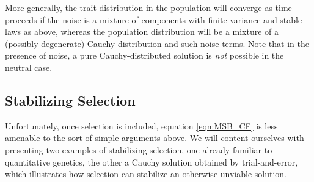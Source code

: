 \documentclass{article}
\newcommand{\eg}{\textit{e.g.,}\,}
\newcommand{\1}{\mathbbm{1}}
\theoremstyle{remark}
\theoremstyle{definition}
\begin{document}



More generally, 
the trait distribution in the population will converge as time proceeds
if the noise is a mixture of components with finite variance and stable laws as above,
whereas the population distribution will be a mixture of a (possibly degenerate) Cauchy distribution and such noise terms. Note that in the presence of noise, a pure Cauchy-distributed solution is \emph{not} possible in the neutral case.

\subsection{Stabilizing Selection}
    \label{sec:stabilizing_selection}
    
Unfortunately, once selection is included, equation \eqref{eqn:MSB_CF} is less amenable to the sort of simple arguments above.  We will content ourselves with presenting two examples of stabilizing selection, one already familiar to quantitative genetics, the other a Cauchy solution obtained by trial-and-error, which illustrates how selection can stabilize an otherwise unviable solution.
\end{document}
